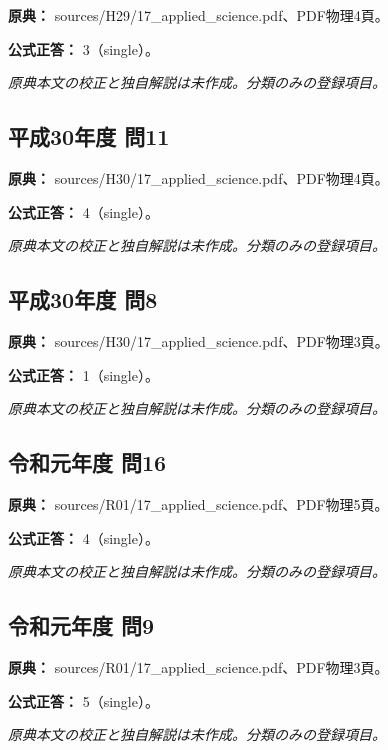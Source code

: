 \noindent\textbf{原典：} sources/H29/17\_applied\_science.pdf、PDF物理4頁。

\textbf{公式正答：} 3（single）。

\par\textit{原典本文の校正と独自解説は未作成。分類のみの登録項目。}

\subsection{平成30年度 問11}
\label{q:h30-reg-applied-11}

\noindent\textbf{原典：} sources/H30/17\_applied\_science.pdf、PDF物理4頁。

\textbf{公式正答：} 4（single）。

\par\textit{原典本文の校正と独自解説は未作成。分類のみの登録項目。}

\subsection{平成30年度 問8}
\label{q:h30-reg-applied-08}

\noindent\textbf{原典：} sources/H30/17\_applied\_science.pdf、PDF物理3頁。

\textbf{公式正答：} 1（single）。

\par\textit{原典本文の校正と独自解説は未作成。分類のみの登録項目。}

\subsection{令和元年度 問16}
\label{q:r01-reg-applied-16}

\noindent\textbf{原典：} sources/R01/17\_applied\_science.pdf、PDF物理5頁。

\textbf{公式正答：} 4（single）。

\par\textit{原典本文の校正と独自解説は未作成。分類のみの登録項目。}

\subsection{令和元年度 問9}
\label{q:r01-reg-applied-09}

\noindent\textbf{原典：} sources/R01/17\_applied\_science.pdf、PDF物理3頁。

\textbf{公式正答：} 5（single）。

\par\textit{原典本文の校正と独自解説は未作成。分類のみの登録項目。}

